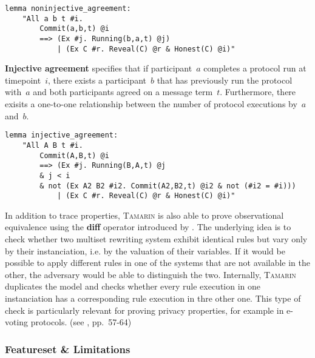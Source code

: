 \begin{lstlisting}[caption={Tamarin non-injective agreement query, according to \cite{tamarin2019manual},~p.~75},label={lst:tamarin-niagreement}]
lemma noninjective_agreement:
    "All a b t #i.
        Commit(a,b,t) @i
        ==> (Ex #j. Running(b,a,t) @j)
            | (Ex C #r. Reveal(C) @r & Honest(C) @i)"
\end{lstlisting}

\textbf{Injective agreement} specifies that if participant~$a$ completes a protocol run at timepoint~$i$, there exists a participant~$b$ that has previously run the protocol with~$a$ and both participants agreed on a message term~$t$.
Furthermore, there exisits a one-to-one relationship between the number of protocol executions by~$a$ and~$b$.

\begin{lstlisting}[caption={Tamarin injective agreement query, according to \cite{tamarin2019manual},~p.~75},label={lst:tamarin-iagreement}]
lemma injective_agreement:
    "All A B t #i.
        Commit(A,B,t) @i
        ==> (Ex #j. Running(B,A,t) @j
        & j < i
        & not (Ex A2 B2 #i2. Commit(A2,B2,t) @i2 & not (#i2 = #i)))
            | (Ex C #r. Reveal(C) @r & Honest(C) @i)"
\end{lstlisting}

In addition to trace properties, \textsc{Tamarin} is also able to prove observational equivalence using the \textsf{\textbf{diff}} operator introduced by \cite{basin2015automated}.
The underlying idea is to check whether two multiset rewriting system exhibit identical rules but vary only by their instanciation, i.e. by the valuation of their variables.
If it would be possible to apply different rules in one of the systems that are not available in the other, the adversary would be able to distinguish the two.
Internally, \textsc{Tamarin} duplicates the model and checks whether every rule execution in one instanciation has a corresponding rule execution in thre other one.
This type of check is particularly relevant for proving privacy properties, for example in e-voting protocols. (see \cite{tamarin2019manual}, pp.~57-64)

\subsubsection{Featureset \& Limitations}

